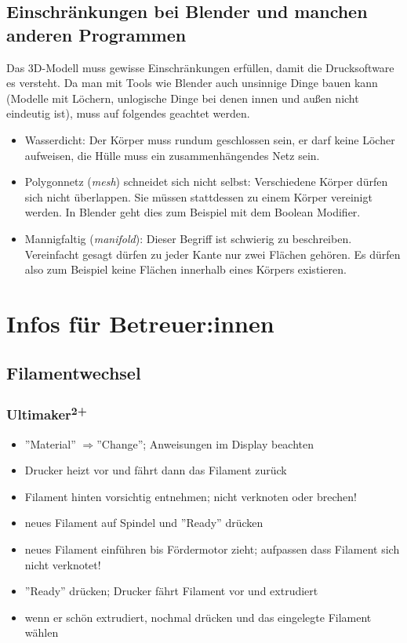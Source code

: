 \documentclass{\basedir/fablab-document}
\newcommand{\fachbegriff}[1]{(\textit{#1})}
\newcommand{\ts}[1]{\textsuperscript{#1}}
\newcommand{\ra}{$\Rightarrow$}
\begin{document}
\subsection{Einschränkungen bei Blender und manchen anderen Programmen} \label{lowlevel-einschraenkungen}

Das 3D-Modell muss gewisse Einschränkungen erfüllen, damit die Drucksoftware es versteht. Da man mit Tools wie Blender auch unsinnige Dinge bauen kann (Modelle mit Löchern, unlogische Dinge bei denen innen und außen nicht eindeutig ist), muss auf folgendes geachtet werden.
\begin{itemize}
\item Wasserdicht: Der Körper muss rundum geschlossen sein, er darf keine
Löcher aufweisen,  die Hülle muss ein zusammenhängendes Netz sein.
\item Polygonnetz \fachbegriff{mesh} schneidet sich nicht selbst: Verschiedene
Körper dürfen sich nicht überlappen. Sie müssen stattdessen zu einem
Körper vereinigt werden. In Blender geht dies zum Beispiel mit dem
Boolean Modifier.
\item Mannigfaltig \fachbegriff{manifold}: Dieser Begriff ist schwierig zu
beschreiben. Vereinfacht gesagt dürfen zu jeder Kante nur zwei Flächen
gehören. Es dürfen also zum Beispiel keine Flächen innerhalb eines
Körpers existieren.
\end{itemize}


\section{Infos für Betreuer:innen}

\subsection{Filamentwechsel}\label{filamentwechsel}

\subsubsection{Ultimaker\ts{2+}}
\begin{itemize}
    \item ''Material'' \ra ''Change''; Anweisungen im Display beachten
    \item Drucker heizt vor und fährt dann das Filament zurück
    \item Filament hinten vorsichtig entnehmen; nicht verknoten oder brechen!
    \item neues Filament auf Spindel und ''Ready'' drücken
    \item neues Filament einführen bis Fördermotor zieht; aufpassen dass Filament sich nicht verknotet!
    \item ''Ready'' drücken; Drucker fährt Filament vor und extrudiert
    \item wenn er schön extrudiert, nochmal drücken und das eingelegte Filament wählen
\end{itemize}
\end{document}
